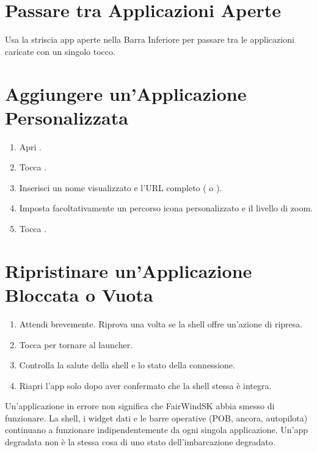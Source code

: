 \section{Passare tra Applicazioni Aperte}

Usa la striscia app aperte nella Barra Inferiore per passare tra le applicazioni caricate
con un singolo tocco.

\section{Aggiungere un'Applicazione Personalizzata}

\begin{enumerate}
  \item Apri .
  \item Tocca .
  \item Inserisci un nome visualizzato e l'URL completo ( o ).
  \item Imposta facoltativamente un percorso icona personalizzato e il livello di zoom.
  \item Tocca .
\end{enumerate}

\section{Ripristinare un'Applicazione Bloccata o Vuota}

\begin{enumerate}
  \item Attendi brevemente. Riprova una volta se la shell offre un'azione di ripresa.
  \item Tocca  per tornare al launcher.
  \item Controlla la salute della shell e lo stato della connessione.
  \item Riapri l'app solo dopo aver confermato che la shell stessa è integra.
\end{enumerate}

\begin{tipbox}
Un'applicazione in errore non significa che FairWindSK abbia smesso di funzionare.
La shell, i widget dati e le barre operative (POB, ancora, autopilota) continuano
a funzionare indipendentemente da ogni singola applicazione.
Un'app degradata non è la stessa cosa di uno stato dell'imbarcazione degradato.
\end{tipbox}
